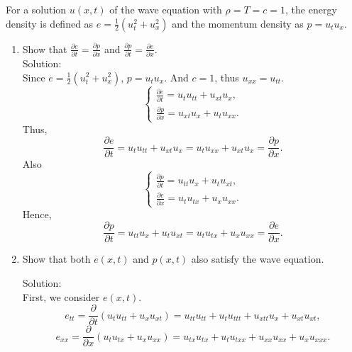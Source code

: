 \documentclass[12pt]{article}%
\begin{document}
\begin{enumerate}
\begin{enumerate}
        For a solution $u\left(x,t\right)$ of the wave equation with $\rho = T = c = 1$, the energy density is defined as $e = \frac{1}{2}\left(u_t^2 + u_x^2\right)$ and the momentum density as $p =u_tu_x$.\smallskip 
        \begin{enumerate}
            \item Show that $\frac{\partial e}{\partial t} = \frac{\partial p}{\partial x}$ and $\frac{\partial p}{\partial t} = \frac{\partial e}{\partial x}$. \smallskip \\
            Solution: \\
            Since $e=\frac{1}{2}\left(u_{t}^{2}+u_{x}^{2}\right)$, $p=u_{t} u_{x} $. And $c=1$, thus $u_{xx}=u_{tt}.$
            \begin{equation*}
                \begin{cases}
                    \frac{\partial e}{\partial t}=u_{t} u_{tt}+u_{xt} u_{x},
                    \\
                    \frac{\partial p}{\partial x}=u_{xt} u_{x}+u_{t} u_{xx}.
                \end{cases}
            \end{equation*}
            Thus, \[\frac{\partial e}{\partial t}=u_{t} u_{t t}+u_{x t} u_{x}=u_{t} u_{x x}+u_{x t} u_{x}=\frac{\partial p}{\partial x} .\]
            Also
            \begin{equation*}
                \begin{cases}
                    \frac{\partial p}{\partial t}=u_{tt} u_{x}+u_{t} u_{xt},
                    \\
                    \frac{\partial e}{\partial x}=u_{t} u_{tx}+u_{x} u_{xx}.
                \end{cases}
            \end{equation*}
            Hence, \[\frac{\partial p}{\partial t}=u_{tt} u_{x}+u_{t} u_{xt}=u_{t} u_{tx}+u_{x} u_{xx}=\frac{\partial e}{\partial x} .\]
            


            \item Show that both $e\left(x,t\right)$ and $p\left(x,t\right)$ also satisfy the wave equation.    
           
            Solution:\\
             First, we consider $e(x,t).$
            \[e_{tt}  =\frac{\partial}{\partial t}\left(u_{t} u_{tt}+u_{x} u_{xt}\right)=u_{tt} u_{tt}+u_{t} u_{ttt}+u_{xtt} u_{x}+u_{xt} u_{xt},\]          
            \[ e_{xx}  =\frac{\partial}{\partial x}\left(u_{t} u_{tx}+u_{x} u_{xx}\right) =u_{tx} u_{tx}+u_{t} u_{txx}+u_{xx} u_{xx}+u_{x} u_{xxx}. \]
            

\end{enumerate}
\end{enumerate}
\end{enumerate}
\end{document}

